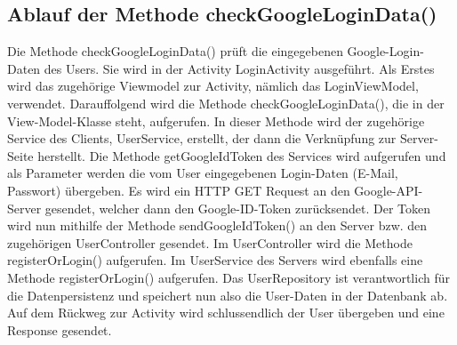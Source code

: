 \subsection{Ablauf der Methode checkGoogleLoginData()}

Die Methode checkGoogleLoginData() prüft die eingegebenen Google-Login-Daten des Users. Sie wird in der Activity LoginActivity ausgeführt. Als Erstes wird das zugehörige Viewmodel zur Activity, nämlich das LoginViewModel, verwendet. Darauffolgend wird die Methode checkGoogleLoginData(), die in der View-Model-Klasse steht, aufgerufen. In dieser Methode wird der zugehörige Service des Clients, UserService, erstellt, der dann die Verknüpfung zur Server-Seite herstellt. Die Methode getGoogleIdToken des Services wird aufgerufen und als Parameter werden die vom User eingegebenen Login-Daten (E-Mail, Passwort) übergeben. Es wird ein HTTP GET Request an den Google-API-Server gesendet, welcher dann den Google-ID-Token zurücksendet. Der Token wird nun mithilfe der Methode sendGoogleIdToken() an den Server bzw. den zugehörigen UserController gesendet. Im UserController wird die Methode registerOrLogin() aufgerufen. Im UserService des Servers wird ebenfalls eine Methode registerOrLogin() aufgerufen. Das UserRepository ist verantwortlich für die Datenpersistenz und speichert nun also die User-Daten in der Datenbank ab. Auf dem Rückweg zur Activity wird schlussendlich der User übergeben und eine Response gesendet.